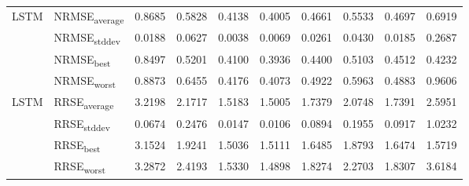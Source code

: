 {\begin{longtable}{l l c c c c c c c c}
\cmidrule(lr){2-10}
\multirow{4}{*}{LSTM} & NRMSE\textsubscript{average} & 0.8685 & 0.5828 & 0.4138 & 0.4005 & 0.4661 & 0.5533 & 0.4697 & 0.6919 \\
 & NRMSE\textsubscript{stddev} & 0.0188 & 0.0627 & 0.0038 & 0.0069 & 0.0261 & 0.0430 & 0.0185 & 0.2687 \\
 & NRMSE\textsubscript{best} & 0.8497 & 0.5201 & 0.4100 & 0.3936 & 0.4400 & 0.5103 & 0.4512 & 0.4232 \\
 & NRMSE\textsubscript{worst} & 0.8873 & 0.6455 & 0.4176 & 0.4073 & 0.4922 & 0.5963 & 0.4883 & 0.9606 \\
\cmidrule(lr){2-10}
\multirow{4}{*}{LSTM} & RRSE\textsubscript{average} & 3.2198 & 2.1717 & 1.5183 & 1.5005 & 1.7379 & 2.0748 & 1.7391 & 2.5951 \\
 & RRSE\textsubscript{stddev} & 0.0674 & 0.2476 & 0.0147 & 0.0106 & 0.0894 & 0.1955 & 0.0917 & 1.0232 \\
 & RRSE\textsubscript{best} & 3.1524 & 1.9241 & 1.5036 & 1.5111 & 1.6485 & 1.8793 & 1.6474 & 1.5719 \\
 & RRSE\textsubscript{worst} & 3.2872 & 2.4193 & 1.5330 & 1.4898 & 1.8274 & 2.2703 & 1.8307 & 3.6184 \\
\cmidrule(lr){2-10}
\end{longtable}
}
